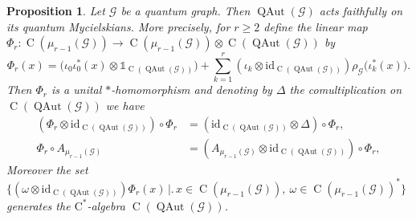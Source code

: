 \documentclass[11pt,reqno]{amsart}
\newtheorem{proposition}{Proposition}[section]
\newcommand{\cst}{\ensuremath{\mathrm{C}^*}}
\newcommand{\id}{\mathrm{id}}
\newcommand{\I}{\mathds{1}}
\newcommand{\comp}{\circ}
\newcommand{\tens}{\otimes}
\DeclareMathOperator{\QAut}{QAut}
\DeclareMathOperator{\C}{C}
\begin{document}
\begin{proposition}\label{prop:Phir}
Let $\mathcal{G}$ be a quantum graph. Then $\QAut(\mathcal{G})$ acts faithfully on its quantum Mycielskians. More precisely, for $r\geq{2}$ define the linear map $\Phi_r\colon\C(\mu_{r-1}(\mathcal{G}))\to\C(\mu_{r-1}(\mathcal{G}))\tens\C(\QAut(\mathcal{G}))$ by
\[
\Phi_r(x)=\bigl(\iota_0\iota_0^*(x)\tens\I_{\C(\QAut(\mathcal{G}))}\bigr)+\sum_{k=1}^r(\iota_k\tens\id_{\C(\QAut(\mathcal{G}))})
\rho_{\scriptscriptstyle\mathcal{G}}\bigl(\iota_k^*(x)\bigr).
\]
Then $\Phi_r$ is a unital $*$-homomorphism and denoting by $\Delta$ the comultiplication on $\C(\QAut(\mathcal{G}))$ we have
\begin{subequations}
\begin{align}
(\Phi_r\tens\id_{\C(\QAut(\mathcal{G}))})\comp\Phi_r&=(\id_{\C(\QAut(\mathcal{G}))}\tens\Delta)\comp\Phi_r,\label{eq:PhirDelta}\\
\Phi_r\comp A_{\scriptscriptstyle\mu_{r-1}(\mathcal{G})} &= (A_{\scriptscriptstyle\mu_{r-1}(\mathcal{G})}\tens\id_{\C(\QAut(\mathcal{G}))})\comp\Phi_r,\label{eq:PhirA}
\end{align}
\end{subequations}
Moreover the set $\bigl\{(\omega\tens\id_{\C(\QAut(\mathcal{G}))})\Phi_r(x)\,\bigr|\bigl.\,x\in\C(\mu_{r-1}(\mathcal{G})),\:\omega\in\C(\mu_{r-1}(\mathcal{G}))^*\bigr\}$ generates the \mbox{\cst-algebra} $\C(\QAut(\mathcal{G}))$.
\end{proposition}
\end{document}
